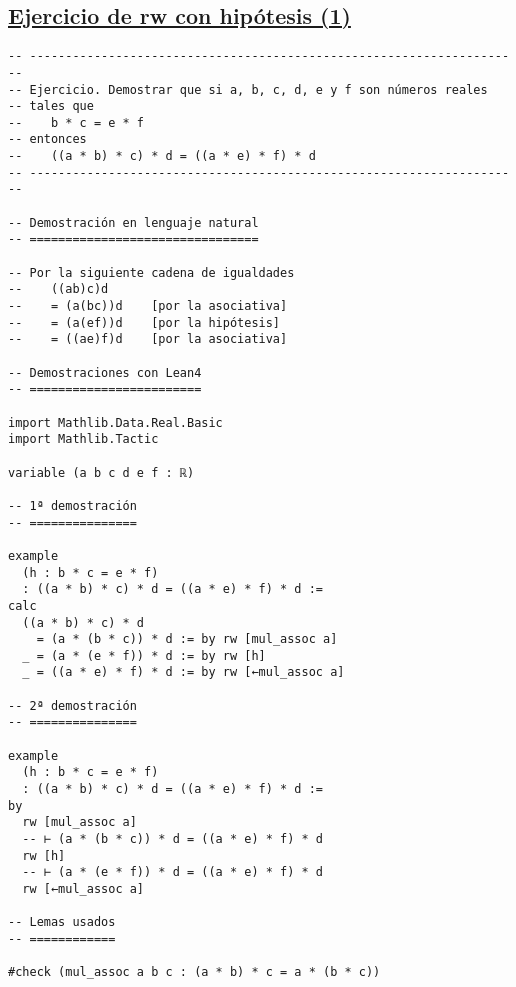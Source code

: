 \subsection{\href{./src/Basicos/Ejercicio\_de\_rw\_sobre\_hipotesis\_1.lean}{Ejercicio de rw con hipótesis (1)}}
\label{sec:org0b27e89}
\begin{verbatim}
-- ---------------------------------------------------------------------
-- Ejercicio. Demostrar que si a, b, c, d, e y f son números reales
-- tales que
--    b * c = e * f
-- entonces
--    ((a * b) * c) * d = ((a * e) * f) * d
-- ---------------------------------------------------------------------

-- Demostración en lenguaje natural
-- ================================

-- Por la siguiente cadena de igualdades
--    ((ab)c)d
--    = (a(bc))d    [por la asociativa]
--    = (a(ef))d    [por la hipótesis]
--    = ((ae)f)d    [por la asociativa]

-- Demostraciones con Lean4
-- ========================

import Mathlib.Data.Real.Basic
import Mathlib.Tactic

variable (a b c d e f : ℝ)

-- 1ª demostración
-- ===============

example
  (h : b * c = e * f)
  : ((a * b) * c) * d = ((a * e) * f) * d :=
calc
  ((a * b) * c) * d
    = (a * (b * c)) * d := by rw [mul_assoc a]
  _ = (a * (e * f)) * d := by rw [h]
  _ = ((a * e) * f) * d := by rw [←mul_assoc a]

-- 2ª demostración
-- ===============

example
  (h : b * c = e * f)
  : ((a * b) * c) * d = ((a * e) * f) * d :=
by
  rw [mul_assoc a]
  -- ⊢ (a * (b * c)) * d = ((a * e) * f) * d
  rw [h]
  -- ⊢ (a * (e * f)) * d = ((a * e) * f) * d
  rw [←mul_assoc a]

-- Lemas usados
-- ============

#check (mul_assoc a b c : (a * b) * c = a * (b * c))
\end{verbatim}

